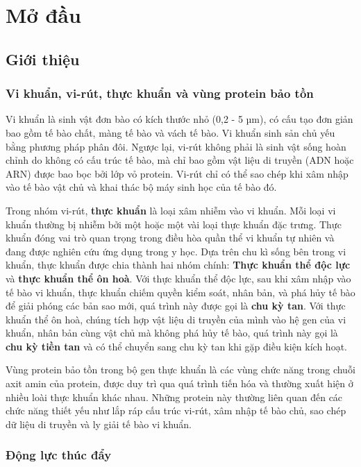 \chapter{Mở đầu}
\setcounter{page}{1}
\section{Giới thiệu}

\subsection{Vi khuẩn, vi-rút, thực khuẩn và vùng protein bảo tồn}

Vi khuẩn là sinh vật đơn bào có kích thước nhỏ (0,2 - 5 µm), có cấu tạo đơn giản bao gồm tế bào chất, màng tế bào và vách tế bào. Vi khuẩn sinh sản chủ yếu bằng phương pháp phân đôi. Ngược lại, vi-rút không phải là sinh vật sống hoàn chỉnh do không có cấu trúc tế bào, mà chỉ bao gồm vật liệu di truyền (ADN hoặc ARN) được bao bọc bởi lớp vỏ protein. Vi-rút chỉ có thể sao chép khi xâm nhập vào tế bào vật chủ và khai thác bộ máy sinh học của tế bào đó.

Trong nhóm vi-rút, \textbf{thực khuẩn} là loại xâm nhiễm vào vi khuẩn. Mỗi loại vi khuẩn thường bị nhiễm bởi một hoặc một vài loại thực khuẩn đặc trưng. Thực khuẩn đóng vai trò quan trọng trong điều hòa quần thể vi khuẩn tự nhiên và đang được nghiên cứu ứng dụng trong y học. Dựa trên chu kì sống bên trong vi khuẩn, thực khuẩn được chia thành hai nhóm chính: \textbf{Thực khuẩn thể độc lực} và \textbf{thực khuẩn thể ôn hoà}. Với thực khuẩn thể độc lực, sau khi xâm nhập vào tế bào vi khuẩn, thực khuẩn chiếm quyền kiểm soát, nhân bản, và phá hủy tế bào để giải phóng các bản sao mới, quá trình này được gọi là \textbf{chu kỳ tan}. Với thực khuẩn thể ôn hoà, chúng tích hợp vật liệu di truyền của mình vào hệ gen của vi khuẩn, nhân bản cùng vật chủ mà không phá hủy tế bào, quá trình này gọi là \textbf{chu kỳ tiền tan} và có thể chuyển sang chu kỳ tan khi gặp điều kiện kích hoạt.

Vùng protein bảo tồn trong bộ gen thực khuẩn là các vùng chức năng trong chuỗi axit amin của protein, được duy trì qua quá trình tiến hóa và thường xuất hiện ở nhiều loài thực khuẩn khác nhau. Những protein này thường liên quan đến các chức năng thiết yếu như lắp ráp cấu trúc vi-rút, xâm nhập tế bào chủ, sao chép dữ liệu di truyền và ly giải tế bào vi khuẩn.


\subsection{Động lực thúc đẩy}

